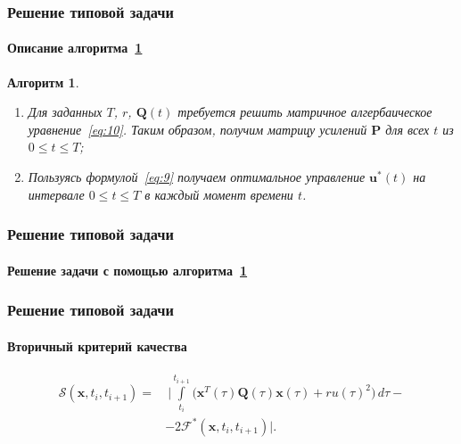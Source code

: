 \documentclass[ignorenonframetext,hyperref={pdftex,unicode,pdfpagelabels=false},compress]{beamer}
\newtheorem{alg}{Алгоритм}
\begin{document}
\begin{frame}
    \frametitle{Решение типовой задачи}
    \framesubtitle{Описание алгоритма~\ref{alg:2}}

    \begin{alg}\label{alg:2}~
        \begin{enumerate}
            \item
                Для заданных $T$, $r$, $\mathbf{Q}(t)$ требуется решить матричное алгербаическое уравнение~\ref{eq:10}. Таким образом, получим матрицу усилений $\mathbf{P}$ для всех $t$ из $0 \leqslant t \leqslant T$;

            \item
                Пользуясь формулой~\ref{eq:9} получаем оптимальное управление $\mathbf{u}^*(t)$ на интервале $0 \leqslant t \leqslant T$ в каждый момент времени $t$.
        \end{enumerate}
    \end{alg}
\end{frame}



\begin{frame}
    \frametitle{Решение типовой задачи}
    \framesubtitle{Решение задачи с помощью алгоритма~\ref{alg:2}}

    \begin{figure}\center
        
        \label{fig:alg2}
    \end{figure}
\end{frame}



\begin{frame}
    \frametitle{Решение типовой задачи}
    \framesubtitle{Вторичный критерий качества}

    \begin{equation}\label{eq:18}
        \begin{split}
            \mathscr{S}(\mathbf{x}, t_i, t_{i+1}) =&~ \Biggl| \int\limits_{t_i}^{t_{i+1}} \bigl( \mathbf{x}^T(\tau)\mathbf{Q}(\tau)\mathbf{x}(\tau) + ru(\tau)^2 \bigr)\,d\tau -\\
            &- 2\mathcal{F}^*(\mathbf{x}, t_i, t_{i+1}) \Biggr| \text{.}
        \end{split}
    \end{equation}
\end{frame}
\end{document}

